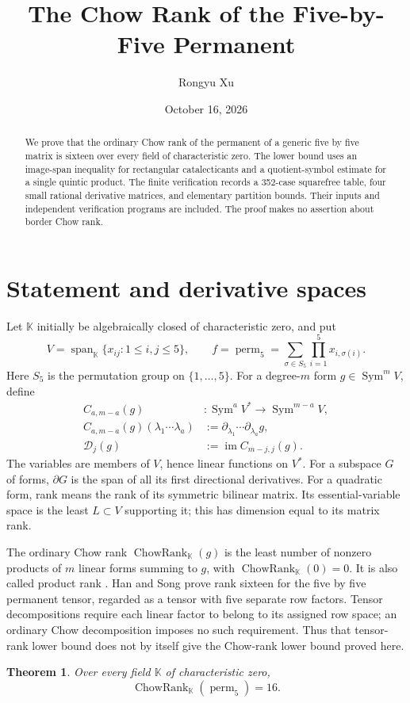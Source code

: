 \documentclass[11pt]{amsart}
\title{The Chow Rank of the Five-by-Five Permanent}
\author{Rongyu Xu}
\date{October 16, 2026}
\newtheorem{theorem}{Theorem}[section]
\theoremstyle{definition}
\numberwithin{equation}{section}
\newcommand{\K}{\mathbb K}
\newcommand{\Sym}{\operatorname{Sym}}
\newcommand{\Span}{\operatorname{span}}
\newcommand{\im}{\operatorname{im}}
\newcommand{\perm}{\operatorname{perm}}
\newcommand{\CR}{\operatorname{ChowRank}}
\newcommand{\cD}{\mathcal D}
\begin{document}
\begin{abstract}
We prove that the ordinary Chow rank of the permanent of a generic five by
five matrix is sixteen over every field of characteristic zero. The lower
bound uses an image-span inequality for rectangular catalecticants and a
quotient-symbol estimate for a single quintic product. The finite
verification records a 352-case squarefree table, four small rational
derivative matrices, and elementary partition bounds. Their inputs and
independent verification programs are included. The proof makes no
assertion about border Chow rank.
\end{abstract}
\maketitle

\section{Statement and derivative spaces}
Let \(\K\) initially be algebraically closed of characteristic zero, and put
\[
 V=\Span_{\K}\{x_{ij}:1\le i,j\le5\},\qquad
 f=\perm_5=\sum_{\sigma\in S_5}\prod_{i=1}^5x_{i,\sigma(i)}.
\]
Here \(S_5\) is the permutation group on \(\{1,\ldots,5\}\).
For a degree-\(m\) form \(g\in\Sym^m V\), define
\[
 \begin{aligned}
 C_{a,m-a}(g)&:\Sym^a V^*\longrightarrow\Sym^{m-a}V,\\
 C_{a,m-a}(g)(\lambda_1\cdots\lambda_a)
   &:=\partial_{\lambda_1}\cdots\partial_{\lambda_a}g,\\
 \cD_j(g)&:=\im C_{m-j,j}(g).
 \end{aligned}
\]
The variables are members of \(V\), hence linear functions on \(V^*\).
For a subspace \(G\) of forms, \(\partial G\) is the span of all its
first directional derivatives. For a quadratic form, rank means the rank of
its symmetric bilinear matrix. Its essential-variable space is the least
\(L\subset V\) supporting it; this has dimension equal to its matrix rank.

The ordinary Chow rank \(\CR_{\K}(g)\) is the least number of nonzero
products of \(m\) linear forms summing to \(g\), with \(\CR_{\K}(0)=0\).
It is also called product rank \cite{IltenTeitler2016}.
Han and Song \cite{HanSong2026} prove rank sixteen for the five by five
permanent tensor, regarded as a tensor with five separate row factors.
Tensor decompositions require each linear factor to belong to its assigned
row space; an ordinary Chow decomposition imposes no such requirement.
Thus that tensor-rank lower bound does not by itself give the Chow-rank
lower bound proved here.
\begin{theorem}\label{thm:main}
Over every field \(\K\) of characteristic zero,
\[\CR_{\K}(\perm_5)=16.\]
\end{theorem}
\end{document}
